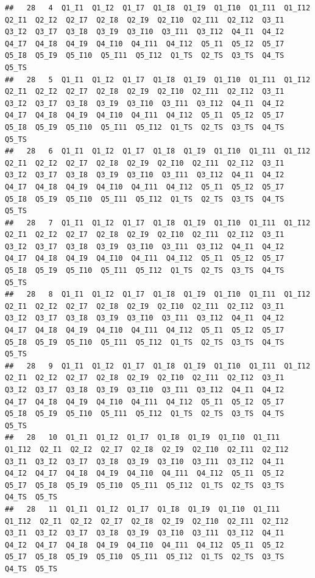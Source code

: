 \documentclass[
]{book}
\begin{document}
\begin{verbatim}
##   28   4  Q1_I1  Q1_I2  Q1_I7  Q1_I8  Q1_I9  Q1_I10  Q1_I11  Q1_I12  Q2_I1  Q2_I2  Q2_I7  Q2_I8  Q2_I9  Q2_I10  Q2_I11  Q2_I12  Q3_I1  Q3_I2  Q3_I7  Q3_I8  Q3_I9  Q3_I10  Q3_I11  Q3_I12  Q4_I1  Q4_I2  Q4_I7  Q4_I8  Q4_I9  Q4_I10  Q4_I11  Q4_I12  Q5_I1  Q5_I2  Q5_I7  Q5_I8  Q5_I9  Q5_I10  Q5_I11  Q5_I12  Q1_TS  Q2_TS  Q3_TS  Q4_TS  Q5_TS
##   28   5  Q1_I1  Q1_I2  Q1_I7  Q1_I8  Q1_I9  Q1_I10  Q1_I11  Q1_I12  Q2_I1  Q2_I2  Q2_I7  Q2_I8  Q2_I9  Q2_I10  Q2_I11  Q2_I12  Q3_I1  Q3_I2  Q3_I7  Q3_I8  Q3_I9  Q3_I10  Q3_I11  Q3_I12  Q4_I1  Q4_I2  Q4_I7  Q4_I8  Q4_I9  Q4_I10  Q4_I11  Q4_I12  Q5_I1  Q5_I2  Q5_I7  Q5_I8  Q5_I9  Q5_I10  Q5_I11  Q5_I12  Q1_TS  Q2_TS  Q3_TS  Q4_TS  Q5_TS
##   28   6  Q1_I1  Q1_I2  Q1_I7  Q1_I8  Q1_I9  Q1_I10  Q1_I11  Q1_I12  Q2_I1  Q2_I2  Q2_I7  Q2_I8  Q2_I9  Q2_I10  Q2_I11  Q2_I12  Q3_I1  Q3_I2  Q3_I7  Q3_I8  Q3_I9  Q3_I10  Q3_I11  Q3_I12  Q4_I1  Q4_I2  Q4_I7  Q4_I8  Q4_I9  Q4_I10  Q4_I11  Q4_I12  Q5_I1  Q5_I2  Q5_I7  Q5_I8  Q5_I9  Q5_I10  Q5_I11  Q5_I12  Q1_TS  Q2_TS  Q3_TS  Q4_TS  Q5_TS
##   28   7  Q1_I1  Q1_I2  Q1_I7  Q1_I8  Q1_I9  Q1_I10  Q1_I11  Q1_I12  Q2_I1  Q2_I2  Q2_I7  Q2_I8  Q2_I9  Q2_I10  Q2_I11  Q2_I12  Q3_I1  Q3_I2  Q3_I7  Q3_I8  Q3_I9  Q3_I10  Q3_I11  Q3_I12  Q4_I1  Q4_I2  Q4_I7  Q4_I8  Q4_I9  Q4_I10  Q4_I11  Q4_I12  Q5_I1  Q5_I2  Q5_I7  Q5_I8  Q5_I9  Q5_I10  Q5_I11  Q5_I12  Q1_TS  Q2_TS  Q3_TS  Q4_TS  Q5_TS
##   28   8  Q1_I1  Q1_I2  Q1_I7  Q1_I8  Q1_I9  Q1_I10  Q1_I11  Q1_I12  Q2_I1  Q2_I2  Q2_I7  Q2_I8  Q2_I9  Q2_I10  Q2_I11  Q2_I12  Q3_I1  Q3_I2  Q3_I7  Q3_I8  Q3_I9  Q3_I10  Q3_I11  Q3_I12  Q4_I1  Q4_I2  Q4_I7  Q4_I8  Q4_I9  Q4_I10  Q4_I11  Q4_I12  Q5_I1  Q5_I2  Q5_I7  Q5_I8  Q5_I9  Q5_I10  Q5_I11  Q5_I12  Q1_TS  Q2_TS  Q3_TS  Q4_TS  Q5_TS
##   28   9  Q1_I1  Q1_I2  Q1_I7  Q1_I8  Q1_I9  Q1_I10  Q1_I11  Q1_I12  Q2_I1  Q2_I2  Q2_I7  Q2_I8  Q2_I9  Q2_I10  Q2_I11  Q2_I12  Q3_I1  Q3_I2  Q3_I7  Q3_I8  Q3_I9  Q3_I10  Q3_I11  Q3_I12  Q4_I1  Q4_I2  Q4_I7  Q4_I8  Q4_I9  Q4_I10  Q4_I11  Q4_I12  Q5_I1  Q5_I2  Q5_I7  Q5_I8  Q5_I9  Q5_I10  Q5_I11  Q5_I12  Q1_TS  Q2_TS  Q3_TS  Q4_TS  Q5_TS
##   28   10  Q1_I1  Q1_I2  Q1_I7  Q1_I8  Q1_I9  Q1_I10  Q1_I11  Q1_I12  Q2_I1  Q2_I2  Q2_I7  Q2_I8  Q2_I9  Q2_I10  Q2_I11  Q2_I12  Q3_I1  Q3_I2  Q3_I7  Q3_I8  Q3_I9  Q3_I10  Q3_I11  Q3_I12  Q4_I1  Q4_I2  Q4_I7  Q4_I8  Q4_I9  Q4_I10  Q4_I11  Q4_I12  Q5_I1  Q5_I2  Q5_I7  Q5_I8  Q5_I9  Q5_I10  Q5_I11  Q5_I12  Q1_TS  Q2_TS  Q3_TS  Q4_TS  Q5_TS
##   28   11  Q1_I1  Q1_I2  Q1_I7  Q1_I8  Q1_I9  Q1_I10  Q1_I11  Q1_I12  Q2_I1  Q2_I2  Q2_I7  Q2_I8  Q2_I9  Q2_I10  Q2_I11  Q2_I12  Q3_I1  Q3_I2  Q3_I7  Q3_I8  Q3_I9  Q3_I10  Q3_I11  Q3_I12  Q4_I1  Q4_I2  Q4_I7  Q4_I8  Q4_I9  Q4_I10  Q4_I11  Q4_I12  Q5_I1  Q5_I2  Q5_I7  Q5_I8  Q5_I9  Q5_I10  Q5_I11  Q5_I12  Q1_TS  Q2_TS  Q3_TS  Q4_TS  Q5_TS

\end{verbatim}
\end{document}
